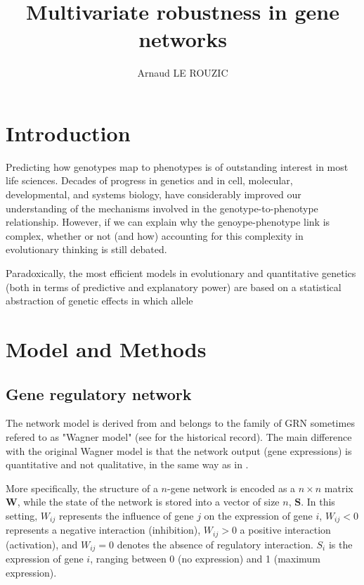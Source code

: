 \documentclass{article}
\title{Multivariate robustness in gene networks}
\author{Arnaud LE ROUZIC}
\date{}
\begin{document}
\maketitle

\section{Introduction}

Predicting how genotypes map to phenotypes is of outstanding interest in most life sciences. Decades of progress in genetics and in cell, molecular, developmental, and systems biology, have considerably improved our understanding of the mechanisms involved in the genotype-to-phenotype relationship. However, if we can explain why the genoype-phenotype link is complex, whether or not (and how) accounting for this complexity in evolutionary thinking is still debated. 

Paradoxically, the most efficient models in evolutionary and quantitative genetics (both in terms of predictive and explanatory power) are based on a statistical abstraction of genetic effects in which allele

\section{Model and Methods}

\subsection{Gene regulatory network}

The network model is derived from \cite{Wag94,Wagner96} and belongs to the family of GRN sometimes refered to as "Wagner model" (see \cite{FierstPhuillips2016} for the historical record). The main difference with the original Wagner model is that the network output (gene expressions) is quantitative and not qualitative, in the same way as in \cite{SB02}. 

More specifically, the structure of a $n$-gene network is encoded as a $n\times n$ matrix $\bm W$, while the state of the network is stored into a vector of size $n$, $\bm S$. In this setting, $W_{ij}$ represents the influence of gene $j$ on the expression of gene $i$, $W_{ij} < 0$ represents a negative interaction (inhibition), $W_{ij} > 0$ a positive interaction (activation), and $W_{ij} = 0$ denotes the absence of regulatory interaction. $S_i$ is the expression of gene $i$, ranging between 0 (no expression) and 1 (maximum expression). 
\end{document}

